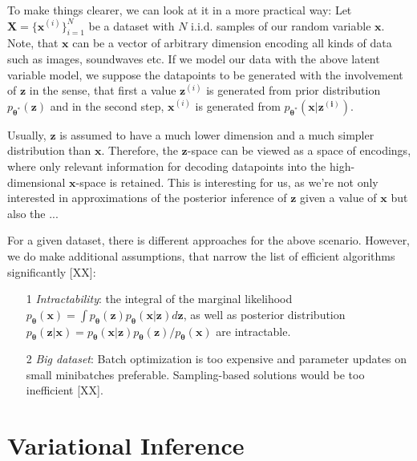 \documentclass[12pt]{report}
\begin{document}
To make things clearer, we can  look at it in a more practical way: Let $\mathbf{X} = \{ \mathbf{x}^{(i)}\}_{i=1}^N$ be a dataset with $N$ i.i.d. samples of our random variable $\mathbf{x}$. Note, that $\mathbf{x}$ can be a vector of arbitrary dimension encoding all kinds of data such as images, soundwaves etc. If we model our data with the above latent variable model, we suppose the datapoints to be generated with the involvement of $\mathbf{z}$ in the sense, that first a value $\mathbf{z}^{(i)}$ is generated from prior distribution $p_{\mathbf{\theta^*}}(\mathbf{z})$ and in the second step, $\mathbf{x}^{(i)}$ is generated from $p_{\mathbf{\theta^*}}(\mathbf{x}|\mathbf{z^{(i)}})$.

Usually, $\mathbf{z}$ is assumed to have a much lower dimension and a much simpler distribution than $\mathbf{x}$. Therefore, the $\mathbf{z}$-space can be viewed as a space of encodings, where only relevant information for decoding datapoints into the high-dimensional $\mathbf{x}$-space is retained. This is interesting for us, as we're not only interested in approximations of the posterior inference of $\mathbf{z}$ given a value of $\mathbf{x}$ but also the ... %

For a given dataset, there is different approaches for the above scenario. However, we do make additional assumptions, that narrow the list of efficient algorithms significantly [XX]:

\begin{itemize}
	\item[1] \emph{Intractability}: the integral of the marginal likelihood $p_{\mathbf{\theta}}(\mathbf{x}) = \int p_{\mathbf{\theta}}(\mathbf{z}) p_{\mathbf{\theta}}(\mathbf{x}|\mathbf{z}) d \mathbf{z}$, as well as posterior distribution $p_{\mathbf{\theta}}(\mathbf{z}|\mathbf{x}) = p_{\mathbf{\theta}}(\mathbf{x}|\mathbf{z}) p_{\mathbf{\theta}}(\mathbf{z}) / p_{\mathbf{\theta}}(\mathbf{x})$ are intractable.
	\item[2] \emph{Big dataset}: Batch optimization is too expensive and parameter updates on small minibatches preferable. Sampling-based solutions would be too inefficient [XX].
\end{itemize}

\section{Variational Inference}
\end{document}

